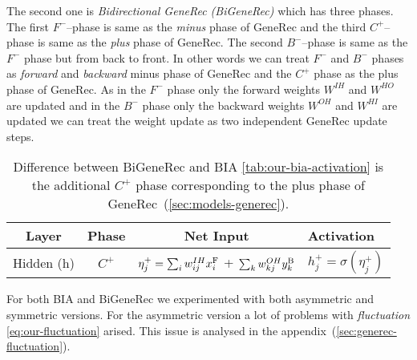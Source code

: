 The second one is \emph{Bidirectional GeneRec (BiGeneRec)} which has three phases. The first $F^{-}$--phase is same as the \emph{minus} phase of GeneRec and the third $C^{+}$--phase is same as the \emph{plus} phase of GeneRec. The second $B^{-}$--phase is same as the $F^{-}$ phase but from back to front. In other words we can treat $F^{-}$ and $B^{-}$ phases as \emph{forward} and \emph{backward} minus phase of GeneRec and the $C^{+}$ phase as the plus phase of GeneRec. As in the $F^{-}$ phase only the forward weights $W^{IH}$ and $W^{HO}$ are updated and in the $B^{-}$ phase only the backward weights $W^{OH}$ and $W^{HI}$ are updated we can treat the weight update as two independent GeneRec update steps. 

\begin{table}[H] 
  \centering
  \begin{tabular}{|cccl|}
    \hline
    Layer & Phase & Net Input & Activation\\
    \hline
    Hidden (h)   &  $C^{+}$  & $\eta^{+}_j = \sum_{i}w_{ij}^{IH}x^{\rm F}_i$ + $\sum_k w_{kj}^{OH}y^{\rm B}_k$ & $h^{+}_{j} = \sigma(\eta^{+}_j)$ \\
    \hline
  \end{tabular}
  \caption{Difference between BiGeneRec and BIA \ref{tab:our-bia-activation} is the additional $C^{+}$ phase corresponding to the plus phase of GeneRec~(\ref{sec:models-generec}).} 
  \label{tab:our-bigenerec-activation}
\end{table} 

For both BIA and BiGeneRec we experimented with both asymmetric and symmetric versions. For the asymmetric version a lot of problems with \emph{fluctuation} \ref{eq:our-fluctuation} arised. This issue is analysed in the appendix~(\ref{sec:generec-fluctuation}). 

